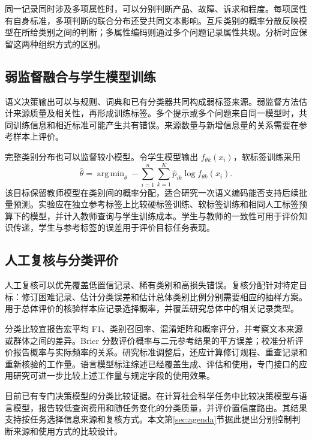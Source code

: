 \documentclass[UTF8,a4paper,zihao=-4,fontset=fandol]{ctexart}
\DeclareMathOperator*{\argmin}{arg\,min}
\begin{document}
同一记录同时涉及多项属性时，可以分别判断产品、故障、诉求和程度。每项属性有自身标准，多项判断的联合分布还受共同文本影响。互斥类别的概率分散反映模型在所给类别之间的判断；多属性编码则通过多个问题记录属性共现。分析时应保留这两种组织方式的区别。

\subsection{弱监督融合与学生模型训练}

语义决策输出可以与规则、词典和已有分类器共同构成弱标签来源。弱监督方法估计来源质量及相关性，再形成训练标签\citep{ratner2017}。多个提示或多个问题来自同一模型时，共同训练信息和相近标准可能产生共有错误。来源数量与新增信息量的关系需要在参考样本上评价。

完整类别分布也可以监督较小模型。令学生模型输出 $f_{\theta k}(x_i)$，软标签训练采用
\begin{equation}
 \widehat\theta=\argmin_\theta
 -\sum_{i=1}^n\sum_{k=1}^K\widehat p_{ik}\log f_{\theta k}(x_i).
 \label{eq:student}
\end{equation}
该目标保留教师模型在类别间的概率分配，适合研究一次语义编码能否支持后续批量预测。实验应在独立参考标签上比较硬标签训练、软标签训练和相同人工标签预算下的模型，并计入教师查询与学生训练成本。学生与教师的一致性可用于评价知识传递，学生与参考标签的误差用于评价目标任务表现。

\subsection{人工复核与分类评价}

人工复核可以优先覆盖低置信记录、稀有类别和高损失错误。复核分配针对特定目标：修订困难记录、估计分类误差和估计总体类别比例分别需要相应的抽样方案。用于总体评价的核验样本应记录选择概率，并覆盖研究总体中的相关记录类型。

分类比较宜报告宏平均 F1、类别召回率、混淆矩阵和概率评分，并考察文本来源或群体之间的差异。Brier 分数评价概率与二元参考结果的平方误差；校准分析评价报告概率与实际频率的关系\citep{guo2017}。研究标准调整后，还应计算修订规程、重查记录和重新核验的工作量。语言模型标注综述已经覆盖生成、评估和使用\citep{tan2024}，专门接口的应用研究可进一步比较上述工作量与规定字段的使用效果。

目前已有专门决策模型的分类比较证据。\citet{ibrahim2026}在计算社会科学任务中比较决策模型与语言模型，报告较低查询费用和随任务变化的分类质量，并评价置信度路由。其结果支持按任务选择信息来源和复核方式。本文第\ref{sec:agenda}节据此提出分别控制判断来源和使用方式的比较设计。
\end{document}
